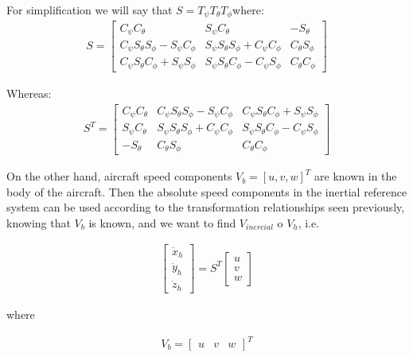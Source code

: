 For simplification we will say that $S = T_{\psi} T_{\theta} T_{\phi}$where:
\begin{gather}
    S
    =
    \begin{bmatrix}
    C_{\psi} C_{\theta} & S_{\psi} C_{\theta} & -S_{\theta}\\
    C_{\psi} S_{\theta} S_{\phi} - S_{\psi} C_{\phi} & S_{\psi} S_{\theta} S_{\phi} + C_{\psi} C_{\phi} & C_{\theta} S_{\phi} \\
    C_{\psi} S_{\theta} C_{\phi} + S_{\psi} S_{\phi} & S_{\psi} S_{\theta} C_{\phi} - C_{\psi} S_{\phi} & C_{\theta} C_{\phi}
    \end{bmatrix}
\end{gather}

Whereas:
\begin{gather}
    S^T 
    =
    \begin{bmatrix}
    C_{\psi} C_{\theta} & C_{\psi} S_{\theta} S_{\phi} - S_{\psi} C_{\phi} & C_{\psi} S_{\theta} C_{\phi} + S_{\psi} S_{\phi}  \\
    S_{\psi} C_{\theta} &  S_{\psi} S_{\theta} S_{\phi} + C_{\psi} C_{\phi} & S_{\psi} S_{\theta} C_{\phi} - C_{\psi} S_{\phi} \\
    -S_{\theta} & C_{\theta} S_{\phi} & C_{\theta} C_{\phi} 
    \end{bmatrix}
\end{gather}

On the other hand, aircraft speed components $V_b = [u,v,w]^T$ are known in the body of the aircraft. Then the absolute speed components in the inertial reference system can be used according to the transformation relationships seen previously, knowing that $V_{b}$ is known, and we want to find $V_{inercial}$ o $V_{h}$, i.e.

\begin{gather}
\label{vh 1}
    \begin{bmatrix}
    \dot x_{h}\\
    \dot y_{h}\\
    \dot z_{h}
    \end{bmatrix}
    =
    S^T
    \begin{bmatrix}
    u\\
    v\\
    w
    \end{bmatrix}
\end{gather}

where

\begin{gather}
    V_{b}
    =
    \begin{bmatrix}
    u & v & w 
    \end{bmatrix}^T
\end{gather}

